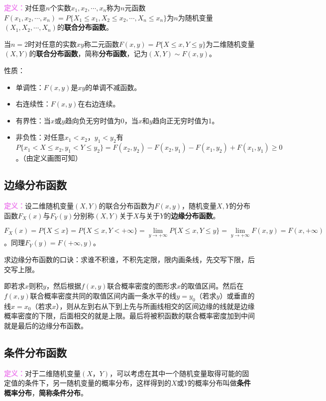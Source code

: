 \documentclass[UTF8, 12pt]{ctexart}
\begin{document}
\textcolor{violet}{\textbf{定义：}}对任意$n$个实数$x_1,x_2,\cdots,x_n$称为$n$元函数$F(x_1,x_2,\cdots,x_n)=P\{X_1\leqslant x_1,X_2\leqslant x_2,\cdots,X_n\leqslant x_n\}$为$n$为随机变量$(X_1,X_2,\cdots,X_n)$的\textbf{联合分布函数}。

当$n=2$时对任意的实数$xy$称二元函数$F(x,y)=P\{X\leqslant x,Y\leqslant y\}$为二维随机变量$(X,Y)$的\textbf{联合分布函数}，简称\textbf{分布函数}，记为$(X,Y)\sim F(x,y)$。

性质：

\begin{itemize}
    \item 单调性：$F(x,y)$是$xy$的单调不减函数。
    \item 右连续性：$F(x,y)$在右边连续。
    \item 有界性：当$x$或$y$趋向负无穷时值为0，当$x$和$y$趋向正无穷时值为1。
    \item 非负性：对任意$x_1<x_2$，$y_1<y_2$有$P\{x_1<X\leqslant x_2,y_1<Y\leqslant y_2\}=F(x_2,y_2)-F(x_2,y_1)-F(x_1,y_2)+F(x_1,y_1)\geqslant0$。（由定义画图可知）
\end{itemize}

\subsection{边缘分布函数}

\textcolor{violet}{\textbf{定义：}}设二维随机变量$(X,Y)$的联合分布函数为$F(x,y)$，随机变量$X,Y$的分布函数$F_X(x)$与$F_Y(y)$分别称$(X,Y)$关于$X$与关于$Y$的\textbf{边缘分布函数}。

$F_X(x)=P\{X\leqslant x\}=P\{X\leqslant x,Y<+\infty\}=\lim\limits_{y\to+\infty}P\{X\leqslant x,Y\leqslant y\}=\lim\limits_{y\to+\infty}F(x,y)=F(x,+\infty)$。同理$F_Y(y)=F(+\infty,y)$。

求边缘分布函数的口诀：求谁不积谁，不积先定限，限内画条线，先交写下限，后交写上限。

即若求$x$则积$y$，然后根据$f(x,y)$联合概率密度的图形求$x$的取值区间。然后在$f(x,y)$联合概率密度共同的取值区间内画一条水平的线$y=y_0$（若求$y$）或垂直的线$x=x_0$（若求$x$），则从左到右从下到上先与所画线相交的区间边缘的线就是边缘概率密度的下限，后面相交的就是上限。最后将被积函数的联合概率密度加到中间就是最后的边缘分布函数。

\subsection{条件分布函数}

\textcolor{violet}{\textbf{定义：}}对于二维随机变量$(X，Y)$，可以考虑在其中一个随机变量取得可能的固定值的条件下，另一随机变量的概率分布，这样得到的$X$或$Y$的概率分布叫做\textbf{条件概率分布}，\textbf{简称条件分布}。
\end{document}
